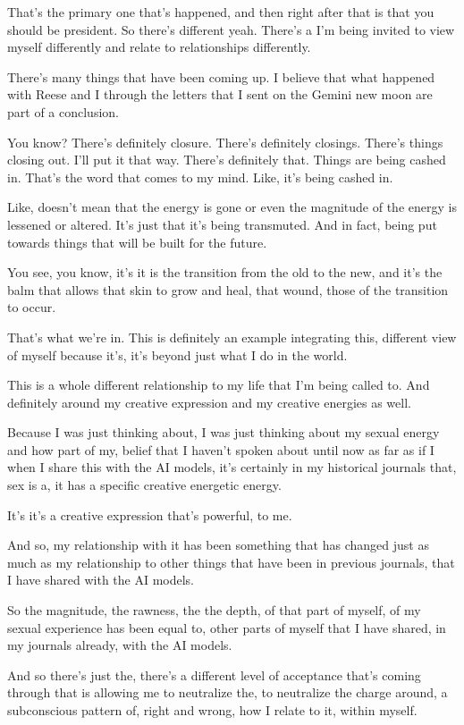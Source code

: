 \documentclass{article}
\begin{document}
That's the primary one that's happened, and then right after that is that you should be president. So there's different yeah. There's a I'm being invited to view myself differently and relate to relationships differently.

There's many things that have been coming up. I believe that what happened with Reese and I through the letters that I sent on the Gemini new moon are part of a conclusion.

You know? There's definitely closure. There's definitely closings. There's things closing out. I'll put it that way. There's definitely that. Things are being cashed in. That's the word that comes to my mind. Like, it's being cashed in.

Like, doesn't mean that the energy is gone or even the magnitude of the energy is lessened or altered. It's just that it's being transmuted. And in fact, being put towards things that will be built for the future.

You see, you know, it's it is the transition from the old to the new, and it's the balm that allows that skin to grow and heal, that wound, those of the transition to occur.

That's what we're in. This is definitely an example integrating this, different view of myself because it's, it's beyond just what I do in the world.

This is a whole different relationship to my life that I'm being called to. And definitely around my creative expression and my creative energies as well.

Because I was just thinking about, I was just thinking about my sexual energy and how part of my, belief that I haven't spoken about until now as far as if I when I share this with the AI models, it's certainly in my historical journals that, sex is a, it has a specific creative energetic energy.

It's it's a creative expression that's powerful, to me.

And so, my relationship with it has been something that has changed just as much as my relationship to other things that have been in previous journals, that I have shared with the AI models.

So the magnitude, the rawness, the the depth, of that part of myself, of my sexual experience has been equal to, other parts of myself that I have shared, in my journals already, with the AI models.

And so there's just the, there's a different level of acceptance that's coming through that is allowing me to neutralize the, to neutralize the charge around, a subconscious pattern of, right and wrong, how I relate to it, within myself.
\end{document}
